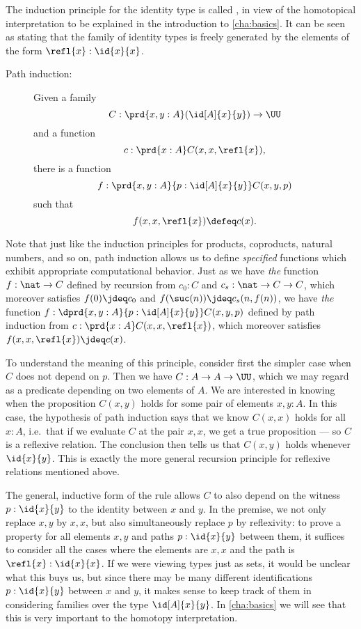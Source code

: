 The induction principle for the identity type is called ,
%
%
in view of the homotopical interpretation to be explained in  the introduction to \cref{cha:basics}.  It can be seen as stating that the family of identity types is freely generated by the elements of the form $\refl{x}: \id{x}{x}$.

\begin{description}
\item[Path induction:] 
  Given a family 
  \[ C : \prd{x,y:A} (\id[A]{x}{y}) \to \UU \]
  and a function
  \[ c :  \prd{x:A} C(x,x,\refl{x}),\]
  there is a function
  \[ f : \prd{x,y:A}{p:\id[A]{x}{y}} C(x,y,p) \]
  such that 
  \[ f(x,x,\refl{x}) \defeq c(x). \]
\end{description}

Note that just like the induction principles for products, coproducts, natural numbers, and so on, path induction allows us to define \emph{specified} functions which exhibit appropriate computational behavior.
Just as we have \emph{the} function $f:\nat\to C$ defined by recursion from $c_0:C$ and $c_s:\nat \to C \to C$, which moreover satisfies $f(0)\jdeq c_0$ and $f(\suc(n))\jdeq c_s(n,f(n))$, we have \emph{the} function $f : \dprd{x,y:A}{p:\id[A]{x}{y}} C(x,y,p)$ defined by path induction from $c :  \prd{x:A} C(x,x,\refl{x})$, which moreover satisfies $f(x,x,\refl{x}) \jdeq c(x)$.

To understand the meaning of this principle, consider first the simpler case when $C$
does not depend on $p$.  Then we have $C:A\to A\to \UU$, which we may
regard as a predicate depending on two elements of $A$.  We are
interested in knowing when the proposition $C(x,y)$ holds for some pair
of elements $x,y:A$.  In this case, the hypothesis of path induction
says that we know $C(x,x)$ holds for all $x:A$, i.e.\ that if we
evaluate $C$ at the pair $x, x$, we get a true proposition --- so $C$ is
a reflexive relation.  The conclusion then tells us that $C(x,y)$ holds
whenever $\id{x}{y}$.  This is exactly the more general recursion principle
for reflexive relations mentioned above.

The general, inductive form of the rule allows $C$ to also depend on the witness $p:\id{x}{y}$ to the identity between $x$ and $y$.  In the premise, we not only replace $x, y$ by $x,x$, but also simultaneously replace $p$ by reflexivity: to prove a property for all elements $x,y$ and paths $p : \id{x}{y}$ between them, it suffices to consider all the cases where the elements are $x,x$ and the path is $\refl{x}: \id{x}{x}$.  If we were viewing types just as sets, it would be unclear what this buys us, but since there may be many different identifications $p : \id{x}{y}$ between $x$ and $y$, it makes sense to keep track of them in considering families over the type $\id[A]{x}{y}$.
In \cref{cha:basics} we will see that this is very important to the homotopy interpretation.

